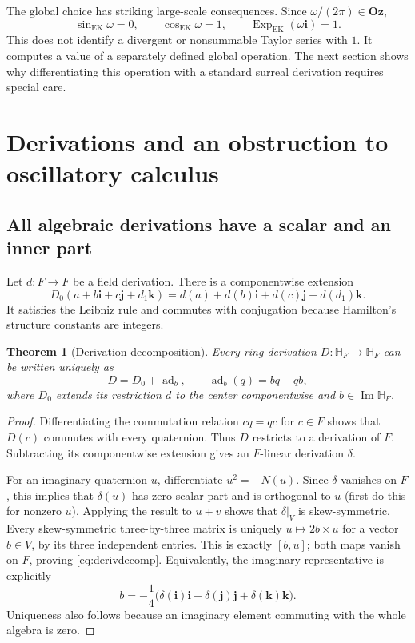 \documentclass[11pt,letterpaper]{article}
\numberwithin{equation}{section}
\newtheorem{theorem}{Theorem}[section]
\theoremstyle{definition}
\theoremstyle{remark}
\newcommand{\HF}{\mathbb H_F}
\newcommand{\Oz}{\mathbf{Oz}}
\newcommand{\ii}{\mathbf i}
\newcommand{\jj}{\mathbf j}
\newcommand{\kk}{\mathbf k}
\newcommand{\Ima}{\operatorname{Im}}
\newcommand{\ad}{\operatorname{ad}}
\newcommand{\Exp}{\operatorname{Exp}}
\begin{document}
The global choice has striking large-scale consequences. Since $\omega/(2\pi)\in\Oz$,
\begin{equation}\label{eq:omegaphase}
 \sin_{\mathrm{EK}}\omega=0,\qquad
 \cos_{\mathrm{EK}}\omega=1,\qquad
 \Exp_{\mathrm{EK}}(\omega\ii)=1.
\end{equation}
This does not identify a divergent or nonsummable Taylor series with $1$. It computes a value
of a separately defined global operation. The next section shows why differentiating this
operation with a standard surreal derivation requires special care.

\section{Derivations and an obstruction to oscillatory calculus}\label{sec:derivations}

\subsection{All algebraic derivations have a scalar and an inner part}
Let $d:F\to F$ be a field derivation. There is a componentwise extension
\begin{equation}\label{eq:coeffderiv}
 D_0(a+b\ii+c\jj+d_1\kk)
 =d(a)+d(b)\ii+d(c)\jj+d(d_1)\kk.
\end{equation}
It satisfies the Leibniz rule and commutes with conjugation because Hamilton's structure
constants are integers.

\begin{theorem}[Derivation decomposition]\label{thm:derivations}
Every ring derivation $D:\HF\to\HF$ can be written uniquely as
\begin{equation}\label{eq:derivdecomp}
 D=D_0+\ad_b,\qquad \ad_b(q)=bq-qb,
\end{equation}
where $D_0$ extends its restriction $d$ to the center componentwise and $b\in\Ima\HF$.
\end{theorem}
\begin{proof}
Differentiating the commutation relation $cq=qc$ for $c\in F$ shows that $D(c)$ commutes
with every quaternion. Thus $D$ restricts to a derivation of $F$. Subtracting its
componentwise extension gives an $F$-linear derivation $\delta$.

For an imaginary quaternion $u$, differentiate $u^2=-N(u)$. Since $\delta$ vanishes on $F$,
this implies that $\delta(u)$ has zero scalar part and is orthogonal to $u$ (first do this
for nonzero $u$). Applying the result to $u+v$ shows that $\delta|_V$ is skew-symmetric.
Every skew-symmetric three-by-three matrix is uniquely $u\mapsto2b\times u$ for a vector
$b\in V$, by its three independent entries. This is exactly $[b,u]$; both maps vanish on
$F$, proving \eqref{eq:derivdecomp}. Equivalently, the imaginary representative is explicitly
\[
 b=-\frac14\bigl(\delta(\ii)\ii+\delta(\jj)\jj+\delta(\kk)\kk\bigr).
\]
Uniqueness also follows because an imaginary element commuting with the whole algebra is
zero.
\end{proof}
\end{document}
